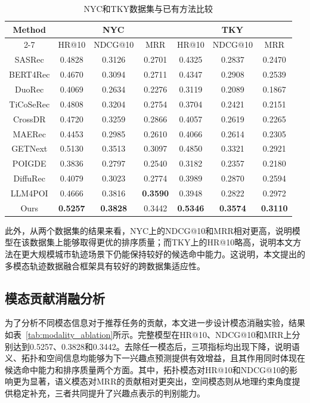 \documentclass{rjthesis}
\begin{document}
\begin{table}[htbp]
\centering
\caption{NYC和TKY数据集与已有方法比较}
\label{tab:overall_performance}
\begin{tabular}{c|ccc|ccc}
\hline
\multirow{2}{*}{Method} & \multicolumn{3}{c|}{NYC} & \multicolumn{3}{c}{TKY}\\
\cline{2-7}
 & HR@10 & NDCG@10 & MRR & HR@10 & NDCG@10 & MRR\\
\hline
SASRec &0.4828&0.3126&0.2701&0.4325&0.2837&0.2470\\
BERT4Rec&0.4670&0.3094&0.2711&0.4347&0.2908&0.2539\\
DuoRec&0.4069&0.2634&0.2276&0.3119&0.2089&0.1867\\
TiCoSeRec&0.4808&0.3204&0.2754&0.3704&0.2421&0.2151\\
CrossDR&0.4720&0.3259&0.2866&0.4057&0.2619&0.2265\\
MAERec&0.4453&0.2985&0.2610&0.4066&0.2614&0.2305\\
GETNext&0.5130&0.3513&0.3097&0.4850&0.3321&0.2921\\
POIGDE&0.3836&0.2797&0.2540&0.3182&0.2357&0.2180\\
DiffuRec&0.4079&0.3023&0.2774&0.3989&0.2870&0.2594\\
LLM4POI&0.4666&0.3816&\textbf{0.3590}&0.3948&0.2822&0.2972\\
Ours&\textbf{0.5257}&\textbf{0.3828}&0.3442&\textbf{0.5346}&\textbf{0.3574}&\textbf{0.3110}\\
\hline
\end{tabular}
\end{table}

此外，从两个数据集的结果来看，NYC上的NDCG@10和MRR相对更高，说明模型在该数据集上能够取得更优的排序质量；而TKY上的HR@10略高，说明本文方法在更大规模城市轨迹场景下仍能保持较好的候选命中能力。这说明，本文提出的多模态轨迹数据融合框架具有较好的跨数据集适应性。

\subsection{模态贡献消融分析}

为了分析不同模态信息对于推荐任务的贡献，本文进一步设计模态消融实验，结果如表~\ref{tab:modality_ablation}所示。完整模型在HR@10、NDCG@10和MRR上分别达到0.5257、0.3828和0.3442。去除任一模态后，三项指标均出现下降，说明语义、拓扑和空间信息均能够为下一兴趣点预测提供有效增益，且其作用同时体现在候选命中能力和排序质量两个方面。其中，拓扑模态对HR@10和NDCG@10的影响更为显著，语义模态对MRR的贡献相对更突出，空间模态则从地理约束角度提供稳定补充，三者共同提升了兴趣点表示的判别能力。
\end{document}
